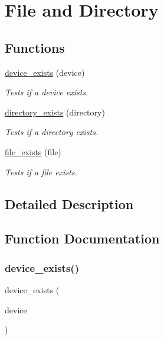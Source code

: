 \hypertarget{group__file__and__dir}{}\section{File and Directory}
\label{group__file__and__dir}
\subsection*{Functions}
\begin{DoxyCompactItemize}
\item 
\hyperlink{group__file__and__dir_ga8f949ce532087014c53e98a7a2d451ea}{device\+\_\+exists} (device)
\begin{DoxyCompactList}\small\item\em Tests if a device exists. \end{DoxyCompactList}\item 
\hyperlink{group__file__and__dir_gaa49f9544909cdab3a323135bbb5a5aff}{directory\+\_\+exists} (directory)
\begin{DoxyCompactList}\small\item\em Tests if a directory exists. \end{DoxyCompactList}\item 
\hyperlink{group__file__and__dir_ga7bafedbe019acc08d0987a035fdf7496}{file\+\_\+exists} (file)
\begin{DoxyCompactList}\small\item\em Tests if a file exists. \end{DoxyCompactList}\end{DoxyCompactItemize}


\subsection{Detailed Description}


\subsection{Function Documentation}
\mbox{\label{group__file__and__dir_ga8f949ce532087014c53e98a7a2d451ea}} 
\subsubsection{\texorpdfstring{device\+\_\+exists()}{device\_exists()}}
{\footnotesize\ttfamily device\+\_\+exists (\begin{DoxyParamCaption}\item[{device}]{ }\end{DoxyParamCaption})}



